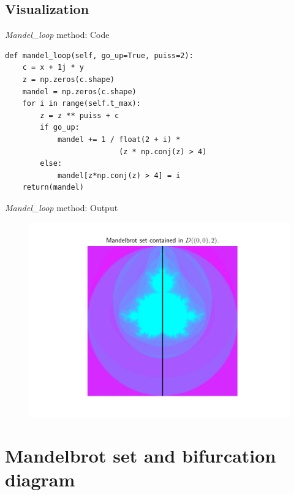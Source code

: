 \documentclass[11pt, compress, tikz]{beamer}
\theoremstyle{definition}
\begin{document}
\subsection{Visualization}


\begin{frame}[fragile]{\emph{Mandel\_loop } method: Code}

\begin{verbatim}
def mandel_loop(self, go_up=True, puiss=2):
    c = x + 1j * y
    z = np.zeros(c.shape)
    mandel = np.zeros(c.shape)
    for i in range(self.t_max):
        z = z ** puiss + c
        if go_up:
            mandel += 1 / float(2 + i) * 
                          (z * np.conj(z) > 4)
        else:
            mandel[z*np.conj(z) > 4] = i
    return(mandel)
\end{verbatim}

\end{frame}

\begin{frame}{\emph{Mandel\_loop } method: Output}
\begin{figure}
\begin{center}
    \includegraphics[scale=0.75, clip, trim={1cm 0 0 2cm}]{mandelbrot.pdf}
\end{center}
\end{figure}
\end{frame}


\section[Link]{Mandelbrot set and bifurcation diagram}
\end{document}
